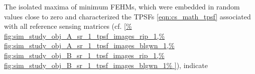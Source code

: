 The isolated maxima of
minimum \acp{FEHM}, which were embedded in
random values close to zero and characterized
the \acp{TPSF}
\eqref{eqn:cs_math_tpsf} associated with
all reference sensing matrices
(cf. \cref{%
  fig:sim_study_obj_A_sr_1_tpsf_images_rip_1,%
  fig:sim_study_obj_A_sr_1_tpsf_images_blgwn_1,%
  fig:sim_study_obj_B_sr_1_tpsf_images_rip_1,%
  fig:sim_study_obj_B_sr_1_tpsf_images_blgwn_1%
}), indicate
